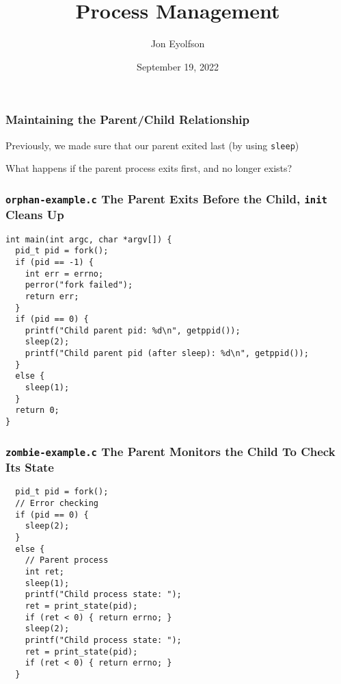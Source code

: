 

\title{Process Management}
\author{Jon Eyolfson}
\date{September 19, 2022}


  \begin{frame}
    \titlepage
  \end{frame}

  \begin{frame}
    \frametitle{Maintaining the Parent/Child Relationship}

    Previously, we made sure that our parent exited last (by using \texttt{sleep})

    \vspace{2em}

    What happens if the parent process exits first, and no longer exists?
  \end{frame}

  \begin{frame}[fragile]
    \frametitle{\texttt{orphan-example.c} The Parent Exits Before the Child, \texttt{init} Cleans Up}

    \begin{lstlisting}
int main(int argc, char *argv[]) {
  pid_t pid = fork();
  if (pid == -1) {
    int err = errno;
    perror("fork failed");
    return err;
  }
  if (pid == 0) {
    printf("Child parent pid: %d\n", getppid());
    sleep(2);
    printf("Child parent pid (after sleep): %d\n", getppid());
  }
  else {
    sleep(1);
  }
  return 0;
}

    \end{lstlisting}
  \end{frame}

  \begin{frame}[fragile]
    \frametitle{\texttt{zombie-example.c} The Parent Monitors the Child To Check Its State}

    \begin{lstlisting}
  pid_t pid = fork();
  // Error checking
  if (pid == 0) {
    sleep(2);
  }
  else {
    // Parent process
    int ret;
    sleep(1);
    printf("Child process state: ");
    ret = print_state(pid);
    if (ret < 0) { return errno; }
    sleep(2);
    printf("Child process state: ");
    ret = print_state(pid);
    if (ret < 0) { return errno; }
  }
    \end{lstlisting}
  \end{frame}


